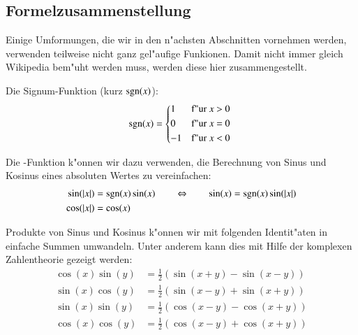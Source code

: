 \subsection{Formelzusammenstellung}
Einige Umformungen, die wir in den n"achsten Abschnitten vornehmen werden, 
verwenden teilweise nicht ganz gel"aufige Funkionen. Damit nicht immer gleich 
Wikipedia bem"uht werden muss, werden diese hier zusammengestellt.

Die Signum-Funktion (kurz $\sgn(x)$):
\begin{equation}
\sgn(x) =
\begin{cases*}
1 & f"ur $x$ > 0 \\
0 & f"ur $x$ = 0 \\
-1 & f"ur $x$ < 0
\end{cases*}
\label{equation:lorenz2:signum}
\end{equation}

Die \sgn-Funktion k"onnen wir dazu verwenden, die Berechnung von Sinus und 
Kosinus eines absoluten Wertes zu vereinfachen:
\begin{equation}
\begin{split}
\sin(|x|) &= \sgn(x)\sin(x) \qquad \Leftrightarrow \qquad \sin(x) = 
\sgn(x)\sin(|x|)
\\
\cos(|x|) &= \cos(x)
\end{split}
\label{equation:lorenz2:sincosabs}
\end{equation}

Produkte von Sinus und Kosinus k"onnen wir mit folgenden Identit"aten in 
einfache Summen umwandeln. Unter anderem kann dies mit Hilfe der komplexen 
Zahlentheorie gezeigt werden:
\begin{align*}
\cos(x)\sin(y) &= \frac{1}{2} \left(\sin(x + y) - \sin(x - y)\right)
\\
\sin(x)\cos(y) &= \frac{1}{2} \left(\sin(x - y) + \sin(x + y)\right)
\\
\sin(x)\sin(y) &= \frac{1}{2} \left(\cos(x - y) - \cos(x + y)\right)
\\
\cos(x)\cos(y) &= \frac{1}{2} \left(\cos(x - y) + \cos(x + y)\right)
\end{align*}
